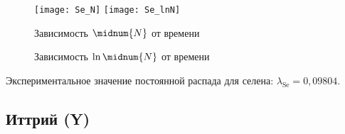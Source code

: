    \begin{figure}[h!]
        \center
        \texttt{[image: Se\_N]} \hfill
        \texttt{[image: Se\_lnN]}
        \parbox{.47\textwidth}{\caption{Зависимость \( \midnum{N} \) от времени}} \hfill
        \parbox{.47\textwidth}{\caption{Зависимость \( \ln \midnum{N} \) от времени}}
    \end{figure}

    Экспериментальное значение постоянной распада для селена:
    \( \lambda_\mathrm{Se} = 0,\!09804 \).

    \newpage

    \subsection{Иттрий (Y)}
    \vspace*{-1em}

